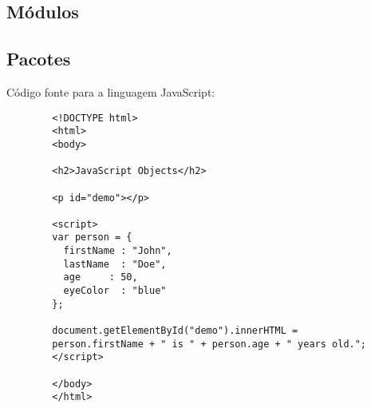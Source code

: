             \subsection{M\'{o}dulos}



            \subsection{Pacotes}






    C\'{o}digo fonte para a linguagem JavaScript:
    \begin{lstlisting}
        <!DOCTYPE html>
        <html>
        <body>

        <h2>JavaScript Objects</h2>

        <p id="demo"></p>

        <script>
        var person = {
          firstName : "John",
          lastName  : "Doe",
          age     : 50,
          eyeColor  : "blue"
        };

        document.getElementById("demo").innerHTML =
        person.firstName + " is " + person.age + " years old.";
        </script>

        </body>
        </html>
    \end{lstlisting}






